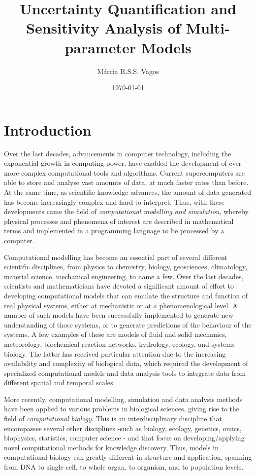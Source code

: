 \documentclass[12pt]{article}
\title{\bfseries{Uncertainty Quantification and Sensitivity Analysis of Multi-parameter Models} \vspace{0.5in}}
\author{M\'{a}rcia R.S.S. Vagos}
\affil{Simula Research Laboratory, Computational Physiology Department}
\affil{University of Oslo, Department of Informatics}
\date{\today}
\begin{document}
	
	\maketitle
	\newpage
	\tableofcontents
	\newpage
	
  \section{Introduction} \label{sec:intro}
  
Over the last decades, advancements in computer technology, including the exponential growth in computing power, have enabled the development of ever more complex computational tools and algorithms. Current supercomputers are able to store and analyse vast amounts of data, at much faster rates than before. At the same time, as scientific knowledge advances, the amount of data generated has become increasingly complex and hard to interpret. Thus, with these developments came the field of \textit{computational modelling and simulation}, whereby physical processes and phenomena of interest are described in mathematical terms and implemented in a programming language to be processed by a computer. 

Computational modelling has become an essential part of several different scientific disciplines, from physics to chemistry, biology, geosciences, climatology, material science, mechanical engineering, to name a few.  Over the last decades, scientists and mathematicians have devoted a significant amount of effort to developing computational models that can emulate the structure and function of real physical systems, either at mechanistic or at a phenomenological level. A number of such models have been successfully implemented to generate new understanding of those systems, or to generate predictions of the behaviour of the systems. A few examples of these are models of fluid and solid mechanics, meteorology, biochemical reaction networks, hydrology, ecology, and systems biology. The latter has received particular attention due to the increasing availability and complexity of biological data, which required the development of specialized computational models and data analysis tools to integrate data from different spatial and temporal scales.  
 
More recently, computational modelling, simulation and data analysis methods have been applied to various problems in biological sciences, giving rise to the field of \textit{computational biology}.  This is an interdisciplinary discipline that encompasses  several other disciplines -such as biology, ecology, genetics, omics, biophysics, statistics, computer science - and that focus on developing/applying novel computational methods for knowledge discovery. Thus, models in computational biology can greatly different in structure and application, spanning from DNA to single cell, to whole organ, to organism, and to population levels. 
\end{document}
